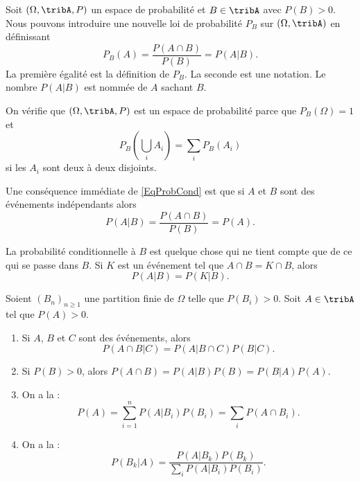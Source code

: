 Soit \( (\Omega,\tribA,P)\) un espace de probabilité et \( B\in\tribA\) avec $P(B)>0$. Nous pouvons introduire une nouvelle loi de probabilité \( P_B\) sur \( (\Omega,\tribA)\) en définissant
\begin{equation}    \label{EqProbCond}
    P_B(A)=\frac{ P(A\cap B) }{ P(B) }=P(A|B).
\end{equation}
La première égalité est la définition de \( P_B\). La seconde est une notation. Le nombre \( P(A|B)\) est nommée  de \( A\) sachant \( B\).

On vérifie que \( (\Omega,\tribA,P)\) est un espace de probabilité parce que \( P_B(\Omega)=1\) et 
\begin{equation}
    P_B(\bigcup_iA_i)=\sum_iP_B(A_i)
\end{equation}
si les \( A_i\) sont deux à deux disjoints.

Une conséquence immédiate de \eqref{EqProbCond} est que si \( A\) et \( B\) sont des événements indépendants alors
\begin{equation}
    P(A|B)=\frac{ P(A\cap B) }{ P(B) }=P(A).
\end{equation}

La probabilité conditionnelle à \( B\) est quelque chose qui ne tient compte que de ce qui se passe dans \( B\). Si \( K\) est un événement tel que \( A\cap B=K\cap B\), alors
\begin{equation}    \label{EqOVHCWom}
    P(A|B)=P(K|B).
\end{equation}

\begin{theorem}     \label{ThoBayesEtAutres}
    Soient \( (B_n)_{n\geq 1}\) une partition finie de \( \Omega\) telle que \( P(B_i)>0\). Soit \( A\in\tribA\) tel que \( P(A)>0\).
    \begin{enumerate}
        \item
            Si \( A\), \( B\) et \( C\) sont des événements, alors
            \begin{equation}
                P(A\cap B|C)=P(A|B\cap C)P(B|C).
            \end{equation}
        \item
            Si \( P(B)>0\), alors \( P(A\cap B)=P(A|B)P(B)=P(B|A)P(A)\).
        \item On a la  :
            \begin{equation}
                P(A)=\sum_{i=1}^nP(A|B_i)P(B_i)=\sum_iP(A\cap B_i).
            \end{equation}
        \item
            On a la  :
            \begin{equation}
                P(B_k|A)=\frac{ P(A|B_k)P(B_k) }{ \sum_iP(A|B_i)P(B_i) }.
            \end{equation}
    \end{enumerate}
\end{theorem}


